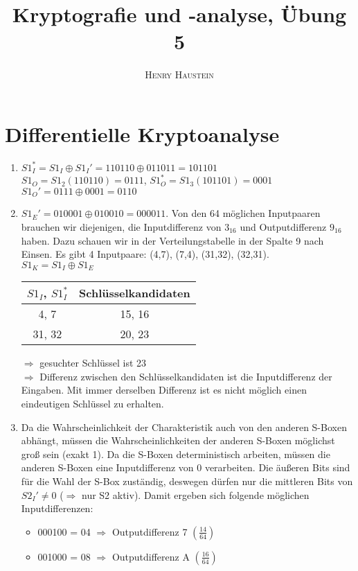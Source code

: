 \documentclass{article}
\title{\textbf{Kryptografie und -analyse, Übung 5}}
\author{\textsc{Henry Haustein}}
\date{}
\begin{document}
	\maketitle

	\section*{Differentielle Kryptoanalyse}
	\begin{enumerate}[label=(\alph*)]
		\item $S1_I^\ast = S1_I \oplus S1_I' = 110110 \oplus 011011 = 101101$ \\
		$S1_O = S1_2(110110) = 0111$, $S1_O^\ast = S1_3(101101) = 0001$ \\
		$S1_O' = 0111 \oplus 0001 = 0110$
		\item $S1_E' = 010001 \oplus 010010 = 000011$. Von den 64 möglichen Inputpaaren brauchen wir diejenigen, die Inputdifferenz von $3_{16}$ und Outputdifferenz $9_{16}$ haben. Dazu schauen wir in der Verteilungstabelle in der Spalte 9 nach Einsen. Es gibt 4 Inputpaare: (4,7), (7,4), (31,32), (32,31). \\
		$S1_K = S1_I \oplus S1_E$
		\begin{center}
			\begin{tabular}{c|c}
				$S1_I$, $S1_I^\ast$ & Schlüsselkandidaten \\
				\hline
				4, 7 & 15, 16 \\
				31, 32 & 20, 23
			\end{tabular}
		\end{center}
		$\Rightarrow$ gesuchter Schlüssel ist 23 \\
		$\Rightarrow$ Differenz zwischen den Schlüsselkandidaten ist die Inputdifferenz der Eingaben. Mit immer derselben Differenz ist es nicht möglich einen eindeutigen Schlüssel zu erhalten.
		\item Da die Wahrscheinlichkeit der Charakteristik auch von den anderen S-Boxen abhängt, müssen die Wahrscheinlichkeiten der anderen S-Boxen möglichst groß sein (exakt 1). Da die S-Boxen deterministisch arbeiten, müssen die anderen S-Boxen eine Inputdifferenz von 0 verarbeiten. Die äußeren Bits sind für die Wahl der S-Box zuständig, deswegen dürfen nur die mittleren Bits von $S2_I' \neq 0$ ($\Rightarrow$ nur S2 aktiv). Damit ergeben sich folgende möglichen Inputdifferenzen:
		\begin{itemize}
			\item 000100 = 04 $\Rightarrow$ Outputdifferenz 7 $\left(\frac{14}{64}\right)$
			\item 001000 = 08 $\Rightarrow$ Outputdifferenz A $\left(\frac{16}{64}\right)$

\end{itemize}
\end{enumerate}
\end{document}
